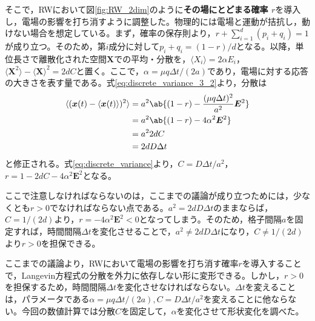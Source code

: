 \documentclass[autodetect-engine,dvi=dvipdfmx,a4paper,ja=standard,oneside,openany,11pt]{bxjsbook}
\begin{document}
そこで，RWにおいて図\ref{fig:RW_2dim}のように\textbf{その場にとどまる確率 $r$}を導入し，電場の影響を打ち消すように調整した。物理的には電場と運動が拮抗し，動けない場合を想定している。まず，確率の保存則より，$r+\sum_{i=1}^{d}(p_i+q_i) =1$が成り立つ。そのため，第$i$成分に対して$p_i+q_i=(1-r)/d$となる。以降，単位長さで離散化された空間$\bm{X}$での平均・分散を，$\langle X_i\rangle=2\alpha E_i$，$\langle\bm{X}^2\rangle-\langle\bm{X}\rangle^2=2dC$と置く。ここで，$\alpha=\mu q\Delta t/(2a)$であり，電場に対する応答の大きさを表す量である。式\eqref{eq:discrete_variance_3_2}より，分散は
\begin{equation}
  \begin{split}
    \langle(\bm{x}(t)-\langle\bm{x}(t)\rangle)^2\rangle & =a^2\ab\{(1-r)-\frac{(\mu q \Delta t)^2}{a^2}\bm{E}^2\} \\
                                                        & =a^2\ab\{(1-r)-4\alpha^2\bm{E}^2\}                      \\
                                                        & =a^2 2dC                                                \\
                                                        & =2dD\Delta t
  \end{split}
  \label{eq:discrete_variance}
\end{equation}
と修正される。式\eqref{eq:discrete_variance}より，$C=D\Delta t/a^2$，$r=1-2dC-4\alpha^2\bm{E}^2$となる。

ここで注意しなければならないのは，ここまでの議論が成り立つためには，少なくとも$r>0$でなければならない点である。$a^2=2dD\Delta t$のままならば，$C=1/(2d)$より，$r=-4\alpha^2\bm{E}^2<0$となってしまう。そのため，格子間隔$a$を固定すれば，時間間隔$\Delta t$を変化させることで，$a^2\neq2dD\Delta t$になり，$C\neq1/(2d)$より$r>0$を担保できる。

ここまでの議論より，RWにおいて電場の影響を打ち消す確率$r$を導入することで，Langevin方程式の分散を外力に依存しない形に変形できる。しかし，$r>0$を担保するため，時間間隔$\Delta t$を変化させなければならない。$\Delta t$を変えることは，パラメータである$\alpha=\mu q\Delta t/(2a),C=D\Delta t/a^2$を変えることに他ならない。今回の数値計算では分散$C$を固定して，$\alpha$を変化させて形状変化を調べた。
\end{document}
